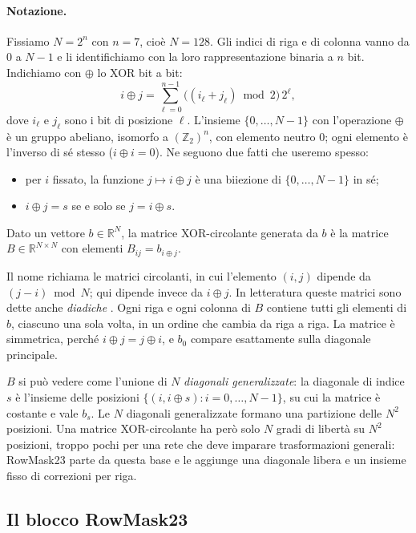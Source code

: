 \paragraph{Notazione.} Fissiamo $N=2^n$ con $n=7$, cioè $N=128$. Gli indici di riga e di colonna vanno da $0$ a $N-1$ e li identifichiamo con la loro rappresentazione binaria a $n$ bit. Indichiamo con $\oplus$ lo XOR bit a bit:
\[
i\oplus j = \sum_{\ell=0}^{n-1} \big((i_\ell + j_\ell)\bmod 2\big)\,2^\ell,
\]
dove $i_\ell$ e $j_\ell$ sono i bit di posizione $\ell$. L'insieme $\{0,\dots,N-1\}$ con l'operazione $\oplus$ è un gruppo abeliano, isomorfo a $(\mathbb{Z}_2)^n$, con elemento neutro $0$; ogni elemento è l'inverso di sé stesso ($i\oplus i=0$). Ne seguono due fatti che useremo spesso:
\begin{itemize}
\item per $i$ fissato, la funzione $j\mapsto i\oplus j$ è una biiezione di $\{0,\dots,N-1\}$ in sé;
\item $i\oplus j = s$ se e solo se $j = i\oplus s$.
\end{itemize}

\begin{definizione}
Dato un vettore $b\in\mathbb{R}^N$, la matrice XOR-circolante generata da $b$ è la matrice $B\in\mathbb{R}^{N\times N}$ con elementi $B_{ij} = b_{i\oplus j}$.
\end{definizione}

Il nome richiama le matrici circolanti, in cui l'elemento $(i,j)$ dipende da $(j-i)\bmod N$; qui dipende invece da $i\oplus j$. In letteratura queste matrici sono dette anche \emph{diadiche} \cite{beauchamp1984applications}. Ogni riga e ogni colonna di $B$ contiene tutti gli elementi di $b$, ciascuno una sola volta, in un ordine che cambia da riga a riga. La matrice è simmetrica, perché $i\oplus j=j\oplus i$, e $b_0$ compare esattamente sulla diagonale principale.

$B$ si può vedere come l'unione di $N$ \emph{diagonali generalizzate}: la diagonale di indice $s$ è l'insieme delle posizioni $\{(i,i\oplus s): i=0,\dots,N-1\}$, su cui la matrice è costante e vale $b_s$. Le $N$ diagonali generalizzate formano una partizione delle $N^2$ posizioni. Una matrice XOR-circolante ha però solo $N$ gradi di libertà su $N^2$ posizioni, troppo pochi per una rete che deve imparare trasformazioni generali: RowMask23 parte da questa base e le aggiunge una diagonale libera e un insieme fisso di correzioni per riga.

\subsection{Il blocco RowMask23}
\label{sec:blocco-rowmask}

